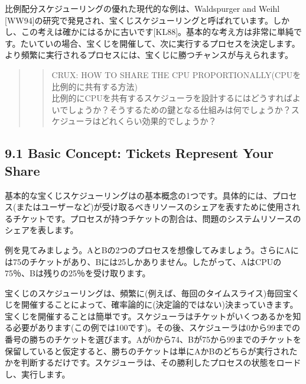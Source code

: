 比例配分スケジューリングの優れた現代的な例は、Waldspurger and Weihl
{[}WW94{]}の研究で発見され、宝くじスケジューリングと呼ばれています。しかし、この考えは確かにはるかに古いです{[}KL88{]}。基本的な考え方は非常に単純です。たいていの場合、宝くじを開催して、次に実行するプロセスを決定します。より頻繁に実行されるプロセスには、宝くじに勝つチャンスが与えられます。

\begin{quote}
\begin{quote}
CRUX: HOW TO SHARE THE CPU PROPORTIONALLY(CPUを比例的に共有する方法)\\
比例的にCPUを共有するスケジューラを設計するにはどうすればよいでしょうか？そうするための鍵となる仕組みは何でしょうか？スケジューラはどれくらい効果的でしょうか？
\end{quote}
\end{quote}

\hypertarget{basic-concept-tickets-represent-your-share}{%
\subsection*{9.1 Basic Concept: Tickets Represent Your
Share}\label{basic-concept-tickets-represent-your-share}}

基本的な宝くじスケジューリングはの基本概念の1つです。具体的には、プロセス(またはユーザーなど)が受け取るべきリソースのシェアを表すために使用されるチケットです。プロセスが持つチケットの割合は、問題のシステムリソースのシェアを表します。

例を見てみましょう。AとBの2つのプロセスを想像してみましょう。さらにAには75のチケットがあり、Bには25しかありません。したがって、AはCPUの75％、Bは残りの25％を受け取ります。

宝くじのスケジューリングは、頻繁に(例えば、毎回のタイムスライス)毎回宝くじを開催することによって、確率論的に(決定論的ではない)決まっていきます。宝くじを開催することは簡単です。スケジューラはチケットがいくつあるかを知る必要があります(この例では100です)。その後、スケジューラは0から99までの番号の勝ちのチケットを選びます。Aが0から74、Bが75から99までのチケットを保留していると仮定すると、勝ちのチケットは単にAかBのどちらが実行されたかを判断するだけです。スケジューラは、その勝利したプロセスの状態をロードし、実行します。

